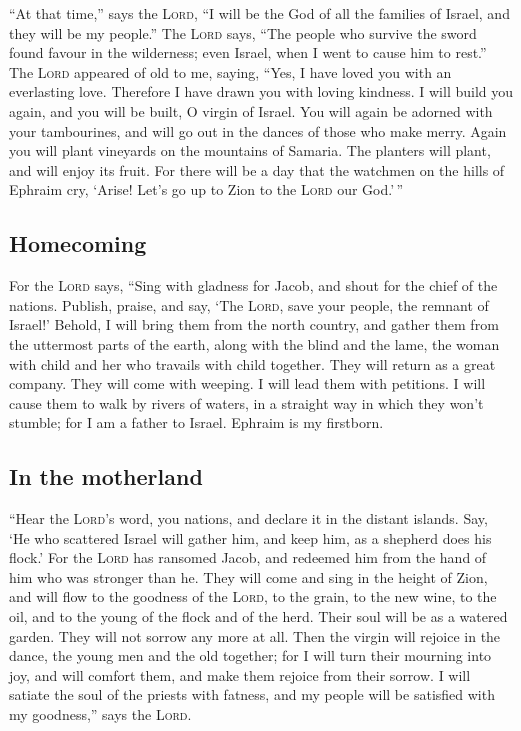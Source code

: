  ``At that time,'' says the \textsc{Lord}, ``I will be the
God of all the families of Israel, and they will be my people.''
 The \textsc{Lord} says, ``The people who survive the
sword found favour in the wilderness; even Israel, when I went to cause
him to rest.''  The \textsc{Lord} appeared of old to me,
saying, ``Yes, I have loved you with an everlasting love. Therefore I
have drawn you with loving kindness.  I will build you
again, and you will be built, O virgin of Israel. You will again be
adorned with your tambourines, and will go out in the dances of those
who make merry.  Again you will plant vineyards on the
mountains of Samaria. The planters will plant, and will enjoy its fruit.
 For there will be a day that the watchmen on the hills of
Ephraim cry, `Arise! Let's go up to Zion to the \textsc{Lord} our
God.'\,''

\hypertarget{homecoming}{%
\subsection{Homecoming}\label{homecoming}}

 For the \textsc{Lord} says, ``Sing with gladness for
Jacob, and shout for the chief of the nations. Publish, praise, and say,
`The \textsc{Lord}, save your people, the remnant of Israel!'
 Behold, I will bring them from the north country, and
gather them from the uttermost parts of the earth, along with the blind
and the lame, the woman with child and her who travails with child
together. They will return as a great company.  They will
come with weeping. I will lead them with petitions. I will cause them to
walk by rivers of waters, in a straight way in which they won't stumble;
for I am a father to Israel. Ephraim is my firstborn.

\hypertarget{in-the-motherland}{%
\subsection{In the motherland}\label{in-the-motherland}}

 ``Hear the \textsc{Lord}'s word, you nations, and
declare it in the distant islands. Say, `He who scattered Israel will
gather him, and keep him, as a shepherd does his flock.' 
For the \textsc{Lord} has ransomed Jacob, and redeemed him from the hand
of him who was stronger than he.  They will come and sing
in the height of Zion, and will flow to the goodness of the
\textsc{Lord}, to the grain, to the new wine, to the oil, and to the
young of the flock and of the herd. Their soul will be as a watered
garden. They will not sorrow any more at all.  Then the
virgin will rejoice in the dance, the young men and the old together;
for I will turn their mourning into joy, and will comfort them, and make
them rejoice from their sorrow.  I will satiate the soul
of the priests with fatness, and my people will be satisfied with my
goodness,'' says the \textsc{Lord}.

